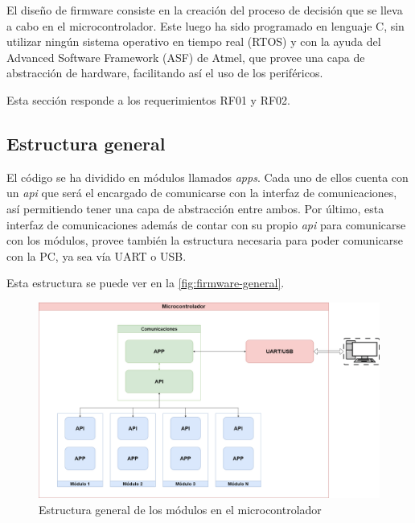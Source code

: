 \documentclass[../et.tex]{subfiles}
\begin{document}
El diseño de firmware consiste en la creación del proceso de decisión que se lleva a cabo en el microcontrolador. Este luego ha sido programado en lenguaje C, sin utilizar ningún sistema operativo en tiempo real (RTOS) y con la ayuda del Advanced Software Framework (ASF) de Atmel, que provee una capa de abstracción de hardware, facilitando así el uso de los periféricos.

Esta sección responde a los requerimientos RF01 y RF02.

\subsection{Estructura general}
El código se ha dividido en módulos llamados \textit{apps}. Cada uno de ellos cuenta con un \textit{api} que será el encargado de comunicarse con la interfaz de comunicaciones, así permitiendo tener una capa de abstracción entre ambos. Por último, esta interfaz de comunicaciones además de contar con su propio \textit{api} para comunicarse con los módulos, provee también la estructura necesaria para poder comunicarse con la PC, ya sea vía UART o USB.

Esta estructura se puede ver en la \autoref{fig:firmware-general}.

    \begin{figure}[!htbp]
        \centering
        \includegraphics[scale=0.23]{diagrams/firmware-general.png}
        \caption{Estructura general de los módulos en el microcontrolador}
        \label{fig:firmware-general}
    \end{figure}
\end{document}
